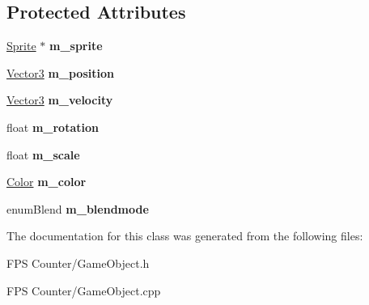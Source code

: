 \subsection*{Protected Attributes}
\begin{DoxyCompactItemize}
\item 
\mbox{\label{class_game_object_ac117fc8efcc2ccb52e6536c87df8fad1}} 
\mbox{\hyperlink{class_sprite}{Sprite}} $\ast$ {\bfseries m\+\_\+sprite}
\item 
\mbox{\label{class_game_object_acd172f669e9fbea80a388448fb450af5}} 
\mbox{\hyperlink{class_vector3}{Vector3}} {\bfseries m\+\_\+position}
\item 
\mbox{\label{class_game_object_a86fcd612b3f44c90454fa50e875f73f1}} 
\mbox{\hyperlink{class_vector3}{Vector3}} {\bfseries m\+\_\+velocity}
\item 
\mbox{\label{class_game_object_a69c4523411c24fd3a4e2b86e748e6742}} 
float {\bfseries m\+\_\+rotation}
\item 
\mbox{\label{class_game_object_aeacf313d6a432fd7ec7c4197f85a2dc1}} 
float {\bfseries m\+\_\+scale}
\item 
\mbox{\label{class_game_object_a1771d24fddc27ba4f1940aaaf8a103eb}} 
\mbox{\hyperlink{class_color}{Color}} {\bfseries m\+\_\+color}
\item 
\mbox{\label{class_game_object_aa2167915430a65181290a0b13168bbe1}} 
enum\+Blend {\bfseries m\+\_\+blendmode}
\end{DoxyCompactItemize}


The documentation for this class was generated from the following files\+:\begin{DoxyCompactItemize}
\item 
F\+P\+S Counter/Game\+Object.\+h\item 
F\+P\+S Counter/Game\+Object.\+cpp\end{DoxyCompactItemize}
